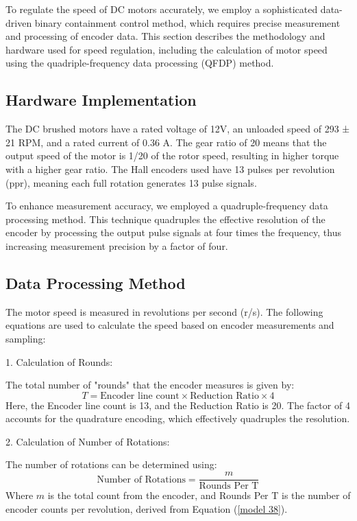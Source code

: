 \documentclass[journal,onecolumn]{IEEEtran}
\begin{document}
To regulate the speed of DC motors accurately, we employ a sophisticated data-driven binary containment control method, which requires precise measurement and processing of encoder data. This section describes the methodology and hardware used for speed regulation, including the calculation of motor speed using the quadriple-frequency data processing (QFDP) method.

\subsection{Hardware Implementation}

The DC brushed motors have a rated voltage of 12V, an unloaded speed of 293 ± 21 RPM, and a rated current of 0.36 A. The gear ratio of 20 means that the output speed of the motor is 1/20 of the rotor speed, resulting in higher torque with a higher gear ratio. The Hall encoders used have 13 pulses per revolution (ppr), meaning each full rotation generates 13 pulse signals. 

To enhance measurement accuracy, we employed a quadruple-frequency data processing method. This technique quadruples the effective resolution of the encoder by processing the output pulse signals at four times the frequency, thus increasing measurement precision by a factor of four.

\subsection{Data Processing Method}

The motor speed is measured in revolutions per second (r/s). The following equations are used to calculate the speed based on encoder measurements and sampling:

1. Calculation of Rounds:

   The total number of "rounds" that the encoder measures is given by:
   \begin{equation}
       \label{model 37}
       T = \text{Encoder line count} \times \text{Reduction Ratio} \times 4
   \end{equation}
   Here, the Encoder line count is 13, and the Reduction Ratio is 20. The factor of 4 accounts for the quadrature encoding, which effectively quadruples the resolution.

2. Calculation of Number of Rotations:

   The number of rotations can be determined using:
   \begin{equation}
       \label{model 38}
       \text{Number of Rotations} = \frac{m}{\text{Rounds Per T}}
   \end{equation}
   Where \( m \) is the total count from the encoder, and Rounds Per T is the number of encoder counts per revolution, derived from Equation (\ref{model 38}).
\end{document}
